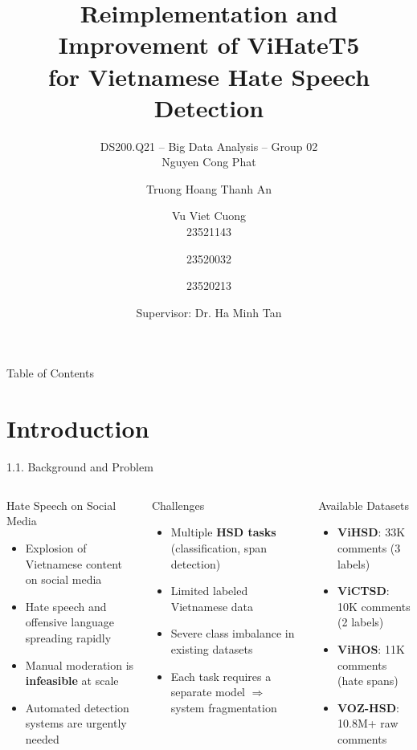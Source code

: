 \documentclass[11pt, aspectratio=169]{beamer}
\title[ViHateT5]{\textbf{Reimplementation and Improvement of ViHateT5 \\ for Vietnamese Hate Speech Detection}}
\author[DS200.Q21]{DS200.Q21 -- Big Data Analysis -- Group 02 \\[0.3em]
Nguyen Cong Phat \and Truong Hoang Thanh An \and Vu Viet Cuong \\
23521143 \and 23520032 \and 23520213}
\institute[UIT]{University of Information Technology -- VNU-HCM}
\date{Supervisor: Dr. Ha Minh Tan}
\begin{document}
\begin{frame}[plain]
  \titlepage
\end{frame}

\begin{frame}{Table of Contents}
  \tableofcontents
\end{frame}

\section{Introduction}

\begin{frame}[fragile, shrink=15]{1.1. Background and Problem}
\begin{columns}[T]
  \begin{block}{Hate Speech on Social Media}
    \begin{itemize}
      \item Explosion of Vietnamese content on social media
      \item Hate speech and offensive language spreading rapidly
      \item Manual moderation is \textbf{infeasible} at scale
      \item Automated detection systems are urgently needed
    \end{itemize}
  \end{block}

  \begin{block}{Challenges}
    \begin{itemize}
      \item Multiple \textbf{HSD tasks} (classification, span detection)
      \item Limited labeled Vietnamese data
      \item Severe class imbalance in existing datasets
      \item Each task requires a separate model $\Rightarrow$ system fragmentation
    \end{itemize}
  \end{block}

  \begin{block}{Available Datasets}
    \begin{itemize}
      \item \textbf{ViHSD}: 33K comments (3 labels)
      \item \textbf{ViCTSD}: 10K comments (2 labels)
      \item \textbf{ViHOS}: 11K comments (hate spans)
      \item \textbf{VOZ-HSD}: 10.8M+ raw comments
    \end{itemize}
  \end{block}


\end{columns}
\end{frame}
\end{document}
